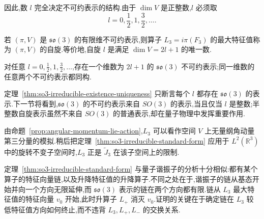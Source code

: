 因此,数 $l$ 完全决定不可约表示的结构.由于 $\dim V$ 是正整数,$l$ 必须取
\[
l=0,\frac12,1,\frac32,\ldots.
\label{eq:so3-spin-values}
\]

\begin{definition}[自旋]\label{def:spin}
若 $(\pi,V)$ 是 $\mathfrak{so}(3)$ 的有限维不可约表示,则算子 $L_3=i\pi(F_3)$ 的最大特征值称为 $(\pi,V)$ 的自旋.等价地,自旋 $l$ 是满足 $\dim V=2l+1$ 的唯一数.
\end{definition}

\begin{theorem}\label{thm:so3-irreducible-existence-uniqueness}
对任意 $l=0,\frac12,1,\frac32,\ldots$,存在一个维数为 $2l+1$ 的 $\mathfrak{so}(3)$ 不可约表示;同一维数的任意两个不可约表示都同构.
\end{theorem}

定理~\ref{thm:so3-irreducible-existence-uniqueness} 只断言每个 $l$ 都存在 $\mathfrak{so}(3)$ 的表示.下一节将看到,$\mathfrak{so}(3)$ 的不可约表示来自 $SO(3)$ 的表示,当且仅当 $l$ 是整数;半整数自旋表示虽然不来自 $SO(3)$ 的普通表示,却在量子物理中发挥重要作用.

由命题~\ref{prop:angular-momentum-lie-action},$L_3$ 可以看作空间 $V$ 上无量纲角动量第三分量的模拟.稍后把定理~\ref{thm:so3-irreducible-standard-form} 应用于 $L^2(\mathbb R^3)$ 中的旋转不变子空间时,$L_3$ 正是 $\widetilde J_3$ 在该子空间上的限制.

定理~\ref{thm:so3-irreducible-standard-form} 与量子谐振子的分析十分相似:都有某个算子的特征向量链,以及升降特征值的升降算子.不同之处在于,谐振子的链从基态开始并向一个方向无限延伸,而 $\mathfrak{so}(3)$ 表示的链在两个方向都有限.链从 $L_3$ 最大特征值的特征向量 $v_0$ 开始,此时升算子 $L_+$ 消灭 $v_0$.证明的关键在于确定链在 $L_3$ 较低特征值方向如何终止,而不违背 $L_3,L_+,L_-$ 的交换关系.

